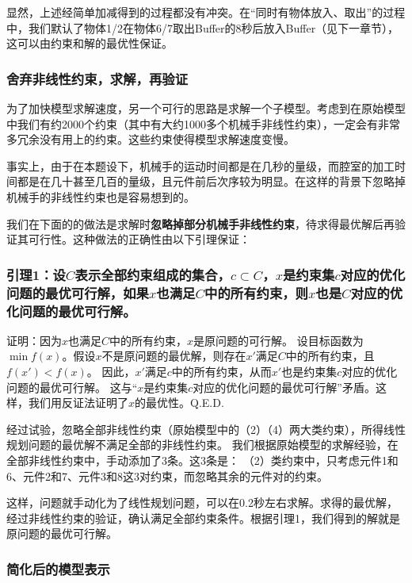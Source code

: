 \documentclass{ctexart}
\begin{document}
{{	显然，上述经简单加减得到的过程都没有冲突。在“同时有物体放入、取出”的过程中，我们默认了物体1/2在物体6/7取出Buffer的8秒后放入Buffer（见下一章节），这可以由约束和解的最优性保证。
	
	
	\subsubsection{舍弃非线性约束，求解，再验证}
	
	为了加快模型求解速度，另一个可行的思路是求解一个子模型。考虑到在原始模型中我们有约2000个约束（其中有大约1000多个机械手非线性约束），一定会有非常多冗余没有用上的约束。这些约束使得模型求解速度变慢。
	
	事实上，由于在本题设下，机械手的运动时间都是在几秒的量级，而腔室的加工时间都是在几十甚至几百的量级，且元件前后次序较为明显。在这样的背景下忽略掉机械手的非线性约束也是容易想到的。
	
	我们在下面的的做法是求解时\textbf{忽略掉部分机械手非线性约束}，待求得最优解后再验证其可行性。这种做法的正确性由以下引理保证：
	
	
	\subsubsection*{引理1：设$C$表示全部约束组成的集合，$c \subset C$，$x$是约束集$c$对应的优化问题的最优可行解，如果$x$也满足$C$中的所有约束，则$x$也是$C$对应的优化问题的最优可行解。}
	
	{
		证明：因为$x$也满足$C$中的所有约束，$x$是原问题的可行解。
		设目标函数为$\min f(x)$。假设$x$不是原问题的最优解，则存在$x'$满足$C$中的所有约束，且$f(x') < f(x)$。
		因此，$x'$满足$c$中的所有约束，从而$x'$也是约束集$c$对应的优化问题的最优可行解。
		这与“$x$是约束集$c$对应的优化问题的最优可行解”矛盾。这样，我们用反证法证明了$x$的最优性。Q.E.D.
	}
	
	\vspace{10pt}
	
	经过试验，忽略全部非线性约束（原始模型中的（2）（4）两大类约束），所得线性规划问题的最优解不满足全部的非线性约束。
	我们根据原始模型的求解经验，在全部非线性约束中，手动添加了3条。这3条是：
	（2）类约束中，只考虑元件1和6、元件2和7、元件3和8这3对约束，而忽略其余的元件对的约束。
	
	
	这样，问题就手动化为了线性规划问题，可以在0.2秒左右求解。求得的最优解，经过非线性约束的验证，确认满足全部约束条件。根据引理1，我们得到的解就是原问题的最优可行解。
	
	\subsubsection{简化后的模型表示}
	
}}
\end{document}
